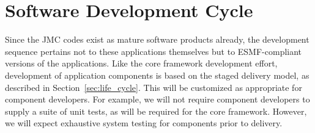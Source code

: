 
\section{Software Development Cycle}
\label{sec:app_life_cycle}

Since the JMC codes exist as mature software products already, the 
development sequence pertains not to these applications themselves 
but to ESMF-compliant versions of the applications.  Like the core 
framework development effort, development of 
application components is based on the staged delivery 
model, as described in Section~\ref{sec:life_cycle}.  This will be
customized as appropriate for component developers.  For example,
we will not require component developers to supply a suite of 
unit tests, as will be required for the core framework.  However,
we will expect exhaustive system testing for components prior to 
delivery.













